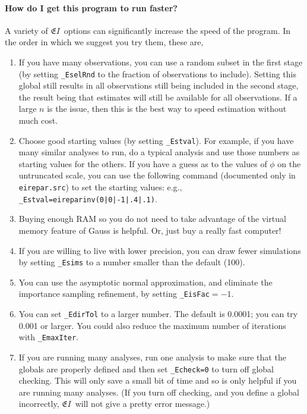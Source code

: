 \documentclass[11pt,titlepage]{article}
\newcommand{\EI}{\ensuremath{{\mathfrak EI}}}
\begin{document}
\paragraph{How do I get this program to run faster?}  A
variety of \EI\ options can significantly increase the speed of the
program.  In the order in which we suggest you try them, these are,
\begin{enumerate}
\item If you have many observations, you can use a random subset in
  the first stage (by setting \texttt{\_EselRnd} to the fraction of
  observations to include).  Setting this global still results in all
  observations still being included in the second stage, the result
  being that estimates will still be available for all observations.
  If a large $n$ is the issue, then this is the best way to speed
  estimation without much cost.

\item Choose good starting values (by setting \texttt{\_Estval}).  For
  example, if you have many similar analyses to run, do a typical
  analysis and use those numbers as starting values for the others.
  If you have a guess as to the values of $\phi$ on the untruncated
  scale, you can use the following command (documented only in
  \texttt{eirepar.src}) to set the starting values: e.g.,
  \texttt{\_Estval=eireparinv(0|0|-1|.4|.1)}.

\item Buying enough RAM so you do not need to take advantage of the
  virtual memory feature of Gauss is helpful.  Or, just buy a really
  fast computer!

\item If you are willing to live with lower precision, you can draw
  fewer simulations by setting \texttt{\_Esims} to a number smaller
  than the default (100).

\item You can use the asymptotic normal approximation, and eliminate
  the importance sampling refinement, by setting
  \texttt{\_EisFac}$=-1$.

\item You can set \texttt{\_EdirTol} to a larger number.  The default
  is 0.0001; you can try 0.001 or larger.  You could also reduce the
  maximum number of iterations with \texttt{\_EmaxIter}.

\item If you are running many analyses, run one analysis to make sure
  that the globals are properly defined and then set
  \texttt{\_Echeck=0} to turn off global checking.  This will only
  save a small bit of time and so is only helpful if you are running
  many analyses.  (If you turn off checking, and you define a global
  incorrectly, \EI\ will not give a pretty error message.)
\end{enumerate}
\end{document}
